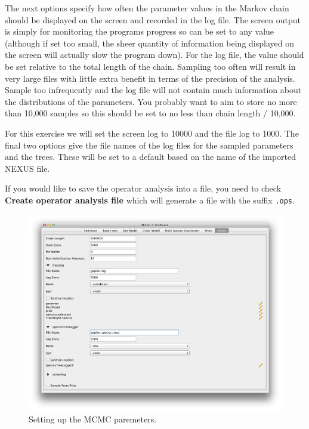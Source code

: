 \documentclass{article}
\begin{document}
The next options specify how often the parameter values in the Markov
chain should be displayed on the screen and recorded in the log file.
The screen output is simply for monitoring the programs progress so
can be set to any value (although if set too small, the sheer quantity
of information being displayed on the screen will actually slow the
program down). For the log file, the value should be set relative
to the total length of the chain. Sampling too often will result in
very large files with little extra benefit in terms of the precision
of the analysis. Sample too infrequently and the log file will not
contain much information about the distributions of the parameters. 
You probably want to aim to store no more than 10,000 samples so this should be
set to no less than chain length / 10,000.

For this exercise we will set the screen log to 10000 and the file log to 1000. The final two
options give the file names of the log files for the sampled parameters and
the trees. These will be set to a default based on the name of the
imported NEXUS file. 

If you would like to save the operator analysis into a file, you need to check  \textbf{Create operator analysis file} which will generate a file with the suffix \texttt{.ops}. 

\begin{figure}
\begin{center}

\includegraphics[scale=0.4]{figures/BEAUti_MCMC}

\end{center}
\caption{\label{fig.MCMC} Setting up the MCMC paremeters.}
\end{figure}
\end{document}
